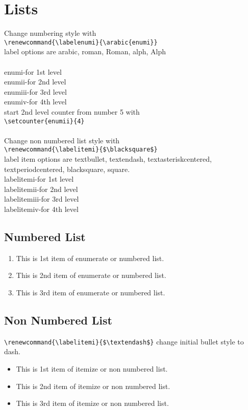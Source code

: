 \documentclass[10pt]{article}
\begin{document}
{\section{Lists\label{Lists}}
Change numbering style with\\
\verb|\renewcommand{\labelenumi}{\arabic{enumi}}| \\
label options are
arabic,
roman,
Roman,
alph,
Alph\\ \\
enumi-for 1st level\\
enumii-for 2nd level\\
enumiii-for 3rd level\\
enumiv-for 4th level\\
start 2nd level counter from
number 5 with\\
\verb|\setcounter{enumii}{4}|
\\ \\
Change non numbered list style
with\\
\verb|\renewcommand{\labelitemi}{$\blacksquare$}|\\
label item options are
textbullet,
textendash,
textasteriskcentered,
textperiodcentered,
blacksquare,
square.\\
labelitemi-for 1st level\\
labelitemii-for 2nd level\\
labelitemiii-for 3rd level\\
labelitemiv-for 4th level\\

\subsection{Numbered List}
\begin{enumerate}
\item This is 1st item of enumerate or numbered list.
\item This is 2nd item of enumerate or numbered list.
\item This is 3rd item of enumerate or numbered list.
\end{enumerate}

\subsection{Non Numbered List}
\verb|\renewcommand{\labelitemi}{$\textendash$}| change initial bullet style to dash.

\begin{itemize}
\item This is 1st item of itemize or non numbered list.
\item This is 2nd item of itemize or non numbered list.
\item This is 3rd item of itemize or non numbered list.
\end{itemize}

}
\end{document}
